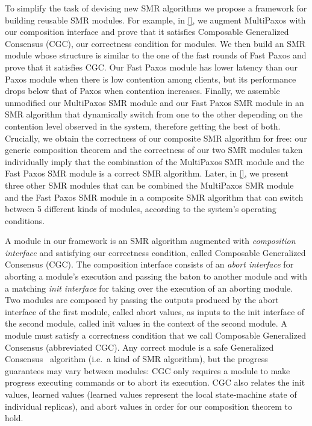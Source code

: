 To simplify the task of devising new SMR algorithms we propose a framework for
building reusable SMR modules.  
For example, in \cref{}, we augment MultiPaxos with our composition interface and prove that it satisfies Composable Generalized Consensus (CGC), our correctness condition for modules.
We then build an SMR module whose structure is similar to the one of the fast rounds of Fast Paxos and prove that it satisfies CGC\@.
Our Fast Paxos module has lower latency than our Paxos module when there is low contention among clients, but its performance drops below that of Paxos when contention increases. 
Finally, we assemble unmodified our MultiPaxos SMR module and our Fast Paxos SMR module in an SMR algorithm that dynamically switch from one to the other depending on the contention level observed in the system, therefore getting the best of both. 
Crucially, we obtain the correctness of our composite SMR algorithm for free: our generic composition theorem and the correctness of our two SMR modules taken individually imply that the combination of the MultiPaxos SMR module and the Fast Paxos SMR module is a correct SMR algorithm.
Later, in \cref{}, we present three other SMR modules that can be combined the MultiPaxos SMR module and the Fast Paxos SMR module in a composite SMR algorithm that can switch between 5 different kinds of modules, according to the system's operating conditions.  

A module in our framework is an SMR algorithm
augmented with \emph{composition interface} and satisfying our correctness condition, called Composable Generalized Consensus (CGC).
The composition interface consists of an \emph{abort interface} for aborting a module's execution and passing
the baton to another module and with a matching \emph{init interface} for taking
over the execution of an aborting module. Two modules are composed by passing
the outputs produced by the abort interface of the first module, called abort
values, as inputs to the init interface of the second module, called init values
in the context of the second module.
A module must satisfy a correctness condition that we call Composable
Generalized Consensus (abbreviated CGC). Any correct module is a safe
Generalized Consensus~\cite{Lamport05GeneralizeConsensus} algorithm (i.e.\ a kind of SMR algorithm), but the progress guarantees may vary between
modules: CGC only requires a module to make progress executing commands or to
abort its execution. CGC also relates the init values, learned values (learned values represent the local state-machine state of individual replicas), and abort values in order for our composition theorem to hold. 


